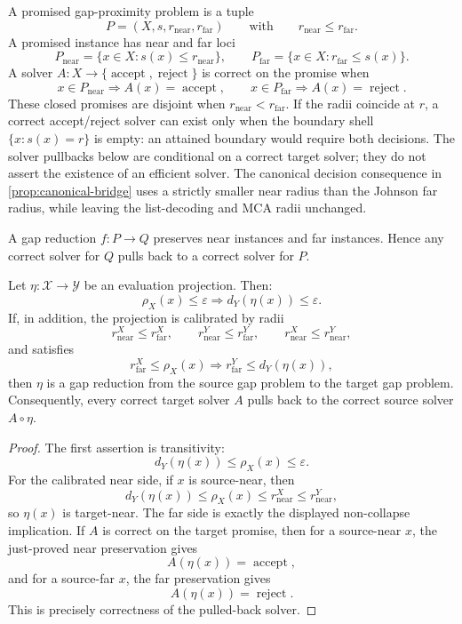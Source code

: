 A promised gap-proximity problem is a tuple
\[
  P=(X,s,r_{\mathrm{near}},r_{\mathrm{far}})
  \qquad
  \text{with}\qquad r_{\mathrm{near}}\le r_{\mathrm{far}}.
\]
A promised instance has near and far loci
\[
  P_{\mathrm{near}}=\{x\in X:s(x)\le r_{\mathrm{near}}\},
  \qquad
  P_{\mathrm{far}}=\{x\in X:r_{\mathrm{far}}\le s(x)\}.
\]
A solver \(A:X\to\{\operatorname{accept},\operatorname{reject}\}\) is correct
on the promise when
\[
  x\in P_{\mathrm{near}}\Rightarrow A(x)=\operatorname{accept},
  \qquad
  x\in P_{\mathrm{far}}\Rightarrow A(x)=\operatorname{reject}.
\]
These closed promises are disjoint when
\(r_{\mathrm{near}}<r_{\mathrm{far}}\). If the radii coincide at \(r\), a
correct accept/reject solver can exist only when the boundary shell
\(\{x:s(x)=r\}\) is empty: an attained boundary would require both decisions.
The solver pullbacks below are conditional on a correct target solver; they
do not assert the existence of an efficient solver.
The canonical decision consequence in \cref{prop:canonical-bridge} uses a
strictly smaller near radius than the Johnson far radius, while leaving the
list-decoding and MCA radii unchanged.

A gap reduction \(f:P\to Q\) preserves near instances and far instances. Hence
any correct solver for \(Q\) pulls back to a correct solver for \(P\).

\begin{proposition}\label{prop:projection-pullback}
Let \(\eta:\mathcal X\to\mathcal Y\) be an evaluation projection.
Then:
\[
  \rho_X(x)\le\varepsilon\Longrightarrow d_Y(\eta(x))\le\varepsilon.
\]
If, in addition, the projection is calibrated by radii
\[
  r^X_{\mathrm{near}}\le r^X_{\mathrm{far}},
  \qquad
  r^Y_{\mathrm{near}}\le r^Y_{\mathrm{far}},
  \qquad
  r^X_{\mathrm{near}}\le r^Y_{\mathrm{near}},
\]
and satisfies
\[
  r^X_{\mathrm{far}}\le\rho_X(x)
  \Longrightarrow
  r^Y_{\mathrm{far}}\le d_Y(\eta(x)),
\]
then \(\eta\) is a gap reduction from the source gap problem to the target gap
problem. Consequently, every correct target solver \(A\) pulls back to the
correct source solver \(A\circ\eta\).
\end{proposition}

\begin{proof}
The first assertion is transitivity:
\[
  d_Y(\eta(x))\le\rho_X(x)\le\varepsilon.
\]
For the calibrated near side, if \(x\) is source-near, then
\[
  d_Y(\eta(x))
  \le \rho_X(x)
  \le r^X_{\mathrm{near}}
  \le r^Y_{\mathrm{near}},
\]
so \(\eta(x)\) is target-near. The far side is exactly the displayed
non-collapse implication. If \(A\) is correct on the target promise, then for
a source-near \(x\), the just-proved near preservation gives
\[
  A(\eta(x))=\operatorname{accept},
\]
and for a source-far \(x\), the far preservation gives
\[
  A(\eta(x))=\operatorname{reject}.
\]
This is precisely correctness of the pulled-back solver.
\end{proof}

